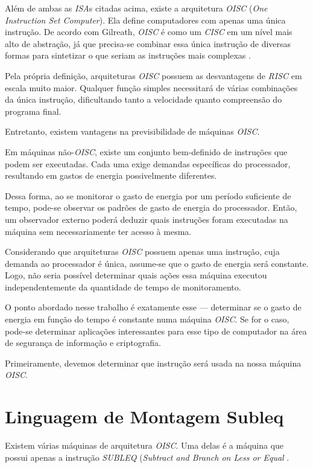 Além de ambas as \textit{ISA}s citadas acima, existe a arquitetura \textit{OISC}
(\textit{One Instruction Set Computer}). Ela define computadores com apenas uma
única instrução. De acordo com Gilreath, \textit{OISC} é como um \textit{CISC}
em um nível mais alto de abstração, já que precisa-se combinar essa única
instrução de diversas formas para sintetizar o que seriam as instruções mais
complexas \cite{minimalist}.


Pela própria definição, arquiteturas \textit{OISC} possuem as desvantagens de
\textit{RISC} em escala muito maior. Qualquer função simples necessitará de
várias combinações da única instrução, dificultando tanto a velocidade quanto
compreensão do programa final.

Entretanto, existem vantagens na previsibilidade de máquinas \textit{OISC}.


Em máquinas não-\textit{OISC}, existe um conjunto bem-definido de instruções que
podem ser executadas. Cada uma exige demandas específicas do processador,
resultando em gastos de energia possivelmente diferentes.

Dessa forma, ao se monitorar o gasto de energia por um período suficiente de
tempo, pode-se observar os padrões de gasto de energia do processador. Então, um
observador externo poderá deduzir quais instruções foram executadas na máquina
sem necessariamente ter acesso à mesma.

Considerando que arquiteturas \textit{OISC} possuem apenas uma instrução, cuja
demanda ao processador é única, assume-se que o gasto de energia será
constante. Logo, não seria possível determinar quais ações essa máquina executou
independentemente da quantidade de tempo de monitoramento.

O ponto abordado nesse trabalho é exatamente esse --- determinar se o gasto de
energia em função do tempo é constante numa máquina \textit{OISC}. Se for o
caso, pode-se determinar aplicações interessantes para esse tipo de computador
na área de segurança de informação e criptografia.

Primeiramente, devemos determinar que instrução será usada na nossa máquina
\textit{OISC}.

\section{Linguagem de Montagem Subleq}
\label{sec:subleq}

Existem várias máquinas de arquitetura \textit{OISC}. Uma delas é a máquina que
possui apenas a instrução \textit{SUBLEQ} (\textit{Subtract and Branch on Less
  or Equal} \cite{subleq}.


